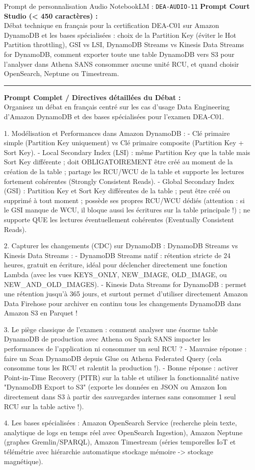 \documentclass[11pt,a4paper]{article}
\begin{document}
\begin{promptbox}{Prompt de personnalisation Audio NotebookLM : \texttt{DEA-AUDIO-11}}
\textbf{Prompt Court Studio (< 450 caractères) :}\\
Débat technique en français pour la certification DEA-C01 sur Amazon DynamoDB et les bases spécialisées : choix de la Partition Key (éviter le Hot Partition throttling), GSI vs LSI, DynamoDB Streams vs Kinesis Data Streams for DynamoDB, comment exporter toute une table DynamoDB vers S3 pour l'analyser dans Athena SANS consommer aucune unité RCU, et quand choisir OpenSearch, Neptune ou Timestream.

\medskip\hrule\medskip
\textbf{Prompt Complet / Directives détaillées du Débat :}\\
Organisez un débat en français centré sur les cas d'usage Data Engineering d'Amazon DynamoDB et des bases spécialisées pour l'examen DEA-C01.

1. Modélisation et Performances dans Amazon DynamoDB :
- Clé primaire simple (Partition Key uniquement) vs Clé primaire composite (Partition Key + Sort Key).
- Local Secondary Index (LSI) : même Partition Key que la table mais Sort Key différente ; doit OBLIGATOIREMENT être créé au moment de la création de la table ; partage les RCU/WCU de la table et supporte les lectures fortement cohérentes (Strongly Consistent Reads).
- Global Secondary Index (GSI) : Partition Key et Sort Key différentes de la table ; peut être créé ou supprimé à tout moment ; possède ses propres RCU/WCU dédiés (attention : si le GSI manque de WCU, il bloque aussi les écritures sur la table principale !) ; ne supporte QUE les lectures éventuellement cohérentes (Eventually Consistent Reads).

2. Capturer les changements (CDC) sur DynamoDB : DynamoDB Streams vs Kinesis Data Streams :
- DynamoDB Streams natif : rétention stricte de 24 heures, gratuit en écriture, idéal pour déclencher directement une fonction Lambda (avec les vues KEYS\_ONLY, NEW\_IMAGE, OLD\_IMAGE, ou NEW\_AND\_OLD\_IMAGES).
- Kinesis Data Streams for DynamoDB : permet une rétention jusqu'à 365 jours, et surtout permet d'utiliser directement Amazon Data Firehose pour archiver en continu tous les changements DynamoDB dans Amazon S3 en Parquet !

3. Le piège classique de l'examen : comment analyser une énorme table DynamoDB de production avec Athena ou Spark SANS impacter les performances de l'application ni consommer un seul RCU ?
- Mauvaise réponse : faire un Scan DynamoDB depuis Glue ou Athena Federated Query (cela consomme tous les RCU et ralentit la production !).
- Bonne réponse : activer Point-in-Time Recovery (PITR) sur la table et utiliser la fonctionnalité native "DynamoDB Export to S3" (exporte les données en JSON ou Amazon Ion directement dans S3 à partir des sauvegardes internes sans consommer 1 seul RCU sur la table active !).

4. Les bases spécialisées : Amazon OpenSearch Service (recherche plein texte, analytique de logs en temps réel avec OpenSearch Ingestion), Amazon Neptune (graphes Gremlin/SPARQL), Amazon Timestream (séries temporelles IoT et télémétrie avec hiérarchie automatique stockage mémoire -> stockage magnétique).
\end{promptbox}
\end{document}
